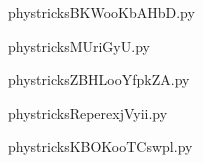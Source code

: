     

    \clearpage
    


    \newcommand{\CaptionFigBKWooKbAHbD}{<+Type your caption here+>}
    \begin{center}
        
    \end{center}
    phystricksBKWooKbAHbD.py

    

    \clearpage
    


    \newcommand{\CaptionFigMUriGyU}{<+Type your caption here+>}
    \begin{center}
        
    \end{center}
    phystricksMUriGyU.py

    

    \clearpage
    


    \newcommand{\CaptionFigZBHLooYfpkZA}{<+Type your caption here+>}
    \begin{center}
        
    \end{center}
    phystricksZBHLooYfpkZA.py

    

    \clearpage
    


    \newcommand{\CaptionFigReperexjVyii}{<+Type your caption here+>}
    \begin{center}
        
    \end{center}
    phystricksReperexjVyii.py

    

    \clearpage
    


    \newcommand{\CaptionFigKBOKooTCswpl}{<+Type your caption here+>}
    \begin{center}
        
    \end{center}
    phystricksKBOKooTCswpl.py

    

    \clearpage
    


